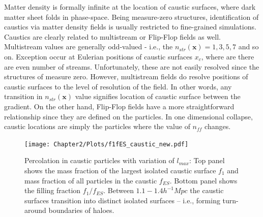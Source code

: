 
Matter density is formally infinite at the location of caustic surfaces, where dark matter sheet folds in phase-space. Being measure-zero structures, identification of caustics via matter density fields is usually restricted to fine-grained simulations. Caustics are clearly related to multistream or Flip-Flop fields as well. Multistream values are generally odd-valued - i.e., the $n_{str}(\mathbf{x}) = 1, 3, 5, 7$  and so on. Exception occur at Eulerian positions of caustic surfaces $x_c$, where are there are even number of streams. Unfortunately, these are not easily resolved since the structures of measure zero. However, multistream fields do resolve positions of caustic surfaces to the level of resolution of the field. In other words, any transition in $n_{str}(\mathbf{x})$ value signifies location of caustic surface between the gradient. On the other hand, Flip-Flop fields have a more straightforward relationship since they are defined on the particles. In one dimensional collapse, caustic locations are simply the particles where the value of $n_{ff}$ changes. 

\begin{figure} 
\centering\texttt{[image: Chapter2/Plots/f1fES\_caustic\_new.pdf]} 
\caption{Percolation in caustic particles with variation of $l_{max}$: Top panel shows the mass fraction of the largest isolated caustic surface $f_1$ and mass fraction of all particles in the caustic $f_{ES}$. Bottom panel shows the filling fraction $f_1/f_{ES}$. Between $1.1-1.4 h^{-1} Mpc$ the caustic surfaces transition into distinct isolated surfaces -- i.e., forming turn-around boundaries of haloes. }
\label{fig:caustic_perc_lmax}
\end{figure}

